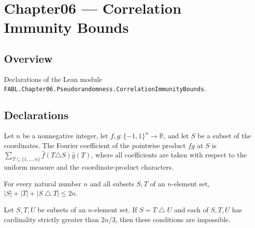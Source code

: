 \chapter{Chapter06 — Correlation Immunity Bounds}
\section{Overview}

Declarations of the Lean module \texttt{FABL.Chapter06.Pseudorandomness.CorrelationImmunityBounds}.

\section{Declarations}

\begin{theorem}
\label{FABL.fourierCoeff_pointwise_mul}
\leanok
{}
Let $n$ be a nonnegative integer, let $f,g:\{-1,1\}^n\to\mathbb R$, and let $S$ be a
subset of the coordinates. The Fourier coefficient of the pointwise product $fg$ at $S$
is $\sum_{T\subseteq\{1,\ldots,n\}}\widehat f(T\triangle S)\widehat g(T)$, where
all coefficients are taken with respect to the uniform measure and the
coordinate-product characters.
\end{theorem}

\begin{theorem}
\label{FABL.card_add_card_add_card_symmDiff_le_two_mul_dimension}
\leanok
{}
For every natural number $n$ and all subsets $S,T$ of an $n$-element set,
$|S|+|T|+|S\mathbin{\triangle}T|\le 2n$.
\end{theorem}

\begin{theorem}
\label{FABL.not_three_large_of_eq_symmDiff}
\leanok
{}
Let $S,T,U$ be subsets of an $n$-element set. If $S=T\mathbin{\triangle}U$ and each of
$S,T,U$ has cardinality strictly greater than $2n/3$, then these conditions are
impossible.
\end{theorem}

